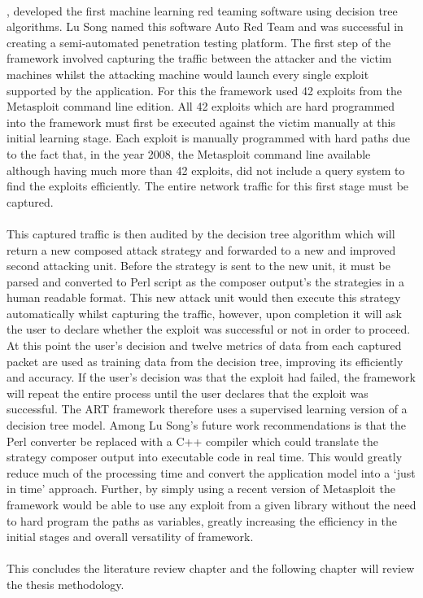 \paragraph{}\cite{ART}, developed the first machine learning red teaming software using decision tree algorithms. Lu Song named this software Auto Red Team and was successful in creating a semi-automated penetration testing platform. The first step of the framework involved capturing the traffic between the attacker and the victim machines whilst the attacking machine would launch every single exploit supported by the application. For this the framework used 42 exploits from the Metasploit command line edition. All 42 exploits which are hard programmed into the framework must first be executed against the victim manually at this initial learning stage. Each exploit is manually programmed with hard paths due to the fact that, in the year 2008, the Metasploit command line available although having much more than 42 exploits, did not include a query system to find the exploits efficiently. The entire network traffic for this first stage must be captured. 

\paragraph{}This captured traffic is then audited by the decision tree algorithm which will return a new composed attack strategy and forwarded to a new and improved second attacking unit. Before the strategy is sent to the new unit, it must be parsed and converted to Perl script as the composer output's the strategies in a human readable format. This new attack unit would then execute this strategy automatically whilst capturing the traffic, however, upon completion it will ask the user to declare whether the exploit was successful or not in order to proceed. At this point the user's decision and twelve metrics of data from each captured packet are used as training data from the decision tree, improving its efficiently and accuracy. If the user's decision was that the exploit had failed, the framework will repeat the entire process until the user declares that the exploit was successful. The ART framework therefore uses a supervised learning version of a decision tree model. Among Lu Song's future work recommendations is that the Perl converter be replaced with a C++ compiler which could translate the strategy composer output into executable code in real time. This would greatly reduce much of the processing time and convert the application model into a ‘just in time' approach. Further, by simply using a recent version of Metasploit the framework would be able to use any exploit from a given library without the need to hard program the paths as variables, greatly increasing the efficiency in the initial stages and overall versatility of framework.

\paragraph{}This concludes the literature review chapter and the following chapter will review the thesis methodology.

